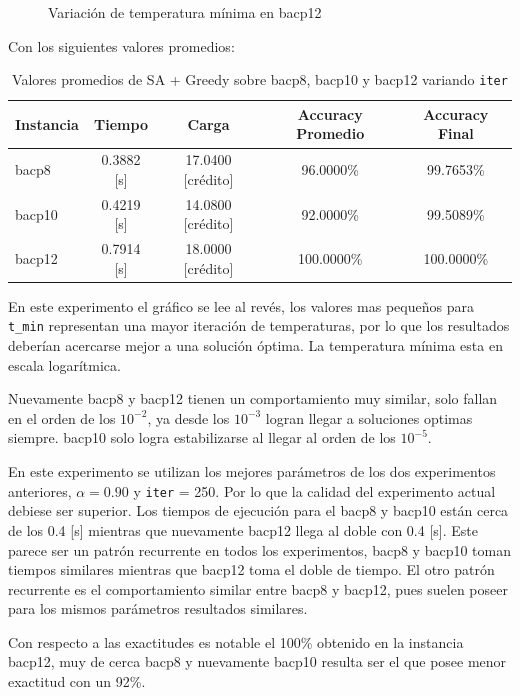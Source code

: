 \documentclass[letterpaper,10pt]{article}
\begin{document}
\begin{figure}[H]
        \caption{Variación de temperatura mínima en bacp12}
        \label{fig:tmin3}
    \endminipage
\end{figure}

Con los siguientes valores promedios:

\begin{table}[H]
  \centering
  \begin{tabular}{@{}lcccc@{}}
    \toprule[1pt]
    Instancia & Tiempo & Carga & Accuracy Promedio & Accuracy Final \\
    \midrule
     bacp8 &  0.3882 [s] & 17.0400 [crédito] &   96.0000\% &  99.7653\% \\
    bacp10 &  0.4219 [s] & 14.0800 [crédito] &   92.0000\% &  99.5089\% \\
    bacp12 &  0.7914 [s] & 18.0000 [crédito] &  100.0000\% & 100.0000\% \\
    \bottomrule
  \end{tabular}
  \caption{Valores promedios de SA + Greedy sobre bacp8, bacp10 y bacp12 variando \texttt{iter}}
\end{table}

En este experimento el gráfico se lee al revés, los valores mas pequeños para \texttt{t\_min} representan una mayor iteración de temperaturas, por lo que los resultados deberían acercarse mejor a una solución óptima. La temperatura mínima esta en escala logarítmica.

Nuevamente bacp8 y bacp12 tienen un comportamiento muy similar, solo fallan en el orden de los $10^{-2}$, ya desde los $10^{-3}$ logran llegar a soluciones optimas siempre. bacp10 solo logra estabilizarse al llegar al orden de los $10^{-5}$.

En este experimento se utilizan los mejores parámetros de los dos experimentos anteriores, $\alpha = 0.90$ y \texttt{iter} = 250. Por lo que la calidad del experimento actual debiese ser superior. Los tiempos de ejecución para el bacp8 y bacp10 están cerca de los 0.4 [s] mientras que nuevamente bacp12 llega al doble con 0.4 [s]. Este parece ser un patrón recurrente en todos los experimentos, bacp8 y bacp10 toman tiempos similares mientras que bacp12 toma el doble de tiempo. El otro patrón recurrente es el comportamiento similar entre bacp8 y bacp12, pues suelen poseer para los mismos parámetros resultados similares.

Con respecto a las exactitudes es notable el 100\% obtenido en la instancia bacp12, muy de cerca bacp8 y nuevamente bacp10 resulta ser el que posee menor exactitud con un 92\%.
\end{document}
